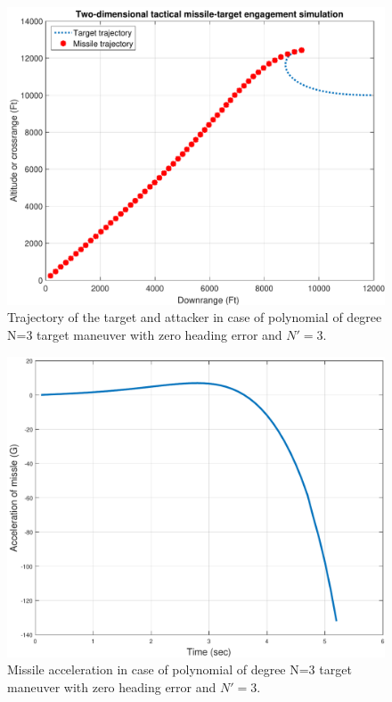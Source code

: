 \begin{figure}[H]
	\centering
	\includegraphics[scale = 0.55]{fig/trajectoryP3N3.pdf}
	\caption{Trajectory of the target and attacker in case of polynomial of degree N=3 target maneuver with zero heading error and $N'=3$.}
	\label{trajectoryP3}
\end{figure}


\begin{figure}[H]
	\centering
	\includegraphics[scale = 0.55]{fig/MissileAccelerationP3N3.pdf}
	\caption{Missile acceleration in case of  polynomial of degree N=3 target maneuver with zero heading error and $N'=3$.}
	\label{missile accelerationP3}
\end{figure}


